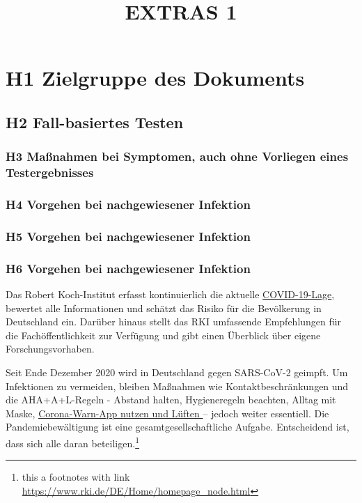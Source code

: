 \documentclass{article}
\begin{document}
\title{EXTRAS 1}

\maketitle


\section{H1 Zielgruppe des Dokuments}\label{H1720422}



\subsection{H2 Fall-basiertes Testen}\label{H2716720}



\subsubsection{H3 Maßnahmen bei Symptomen, auch ohne Vorliegen eines Testergebnisses}\label{H380543}



\subsubsection{H4 Vorgehen bei nachgewiesener Infektion}\label{H7768565}



\subsubsection{H5 Vorgehen bei nachgewiesener Infektion}\label{H9682083}



\subsubsection{H6 Vorgehen bei nachgewiesener Infektion}\label{H5952869}



Das Robert Koch-Institut erfasst kontinuierlich die aktuelle \hyperlink{F27326161}{COVID-19-Lage}, bewertet alle Informationen und schätzt das Risiko für die Bevölkerung in Deutschland ein. Darüber hinaus stellt das RKI umfassende Empfehlungen für die Fachöffentlichkeit zur Verfügung und gibt einen Überblick über eigene Forschungsvorhaben.



Seit Ende Dezember 2020 wird in Deutschland gegen SARS-CoV-2 geimpft. Um Infektionen zu vermeiden, bleiben Maßnahmen wie Kontaktbeschränkungen und die AHA+A+L-Regeln - Abstand halten, Hygieneregeln beachten, Alltag mit Maske, \href{https://www.rki.de/DE/Home/homepage_node.html}{Corona-Warn-App nutzen und Lüften }– jedoch weiter essentiell. Die Pandemiebewältigung ist eine gesamtgesellschaftliche Aufgabe. Entscheidend ist, dass sich alle daran beteiligen.\footnote{this a footnotes with link \href{https://www.rki.de/DE/Home/homepage_node.html}{https://www.rki.de/DE/Home/homepage\_node.html}}
\end{document}
